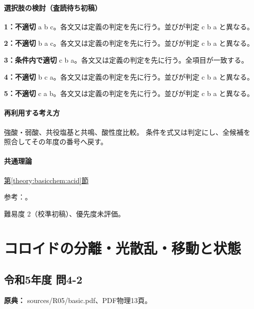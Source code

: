 \paragraph{選択肢の検討（査読待ち初稿）}\mbox{}\par

\noindent\textbf{1：不適切} a b c。各文又は定義の判定を先に行う。並びが判定 c b a と異なる。\par

\noindent\textbf{2：不適切} b a c。各文又は定義の判定を先に行う。並びが判定 c b a と異なる。\par

\noindent\textbf{3：条件内で適切} c b a。各文又は定義の判定を先に行う。全項目が一致する。\par

\noindent\textbf{4：不適切} b c a。各文又は定義の判定を先に行う。並びが判定 c b a と異なる。\par

\noindent\textbf{5：不適切} c a b。各文又は定義の判定を先に行う。並びが判定 c b a と異なる。\par

\paragraph{再利用する考え方} 強酸・弱酸、共役塩基と共鳴、酸性度比較。 条件を式又は判定にし、全候補を照合してその年度の番号へ戻す。

\paragraph{共通理論} \hyperref[theory:basicchem:acid]{第\ref*{theory:basicchem:acid}節}

\par 参考：\cite{purdue_acid_strength}。

\par 難易度 2（校準初稿）、優先度未評価。

\section{コロイドの分離・光散乱・移動と状態}

\subsection{令和5年度 問4-2}
\label{q:r05-reg-basic-4-2}

\noindent\textbf{原典：} sources/R05/basic.pdf、PDF物理13頁。


